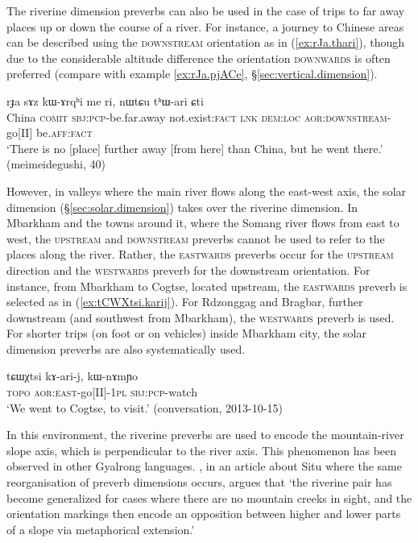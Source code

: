 The  riverine dimension preverbs can also be used in the case of trips to far away places up or down the course of a river. For instance, a journey to Chinese areas can be described using the \textsc{downstream} orientation as in (\ref{ex:rJa.thari}), though due to the considerable altitude difference the orientation \textsc{downwards} is often preferred (compare with example \ref{ex:rJa.pjACe}, §\ref{sec:vertical.dimension}).

 \begin{exe}
\ex \label{ex:rJa.thari}
\gll rɟa sɤz kɯ-ɤrqʰi me ri, nɯtɕu tʰɯ-ari ɕti  \\
China \textsc{comit} \textsc{sbj}:\textsc{pcp}-be.far.away not.exist:\textsc{fact} \textsc{lnk} \textsc{dem}:\textsc{loc} \textsc{aor}:\textsc{downstream}-go[II] be.\textsc{aff}:\textsc{fact} \\
\glt `There is no [place] further away [from here] than China, but he went there.' (meimeidegushi, 40)
\end{exe}
 
However, in valleys where the main river flows along the east-west axis, the solar dimension (§\ref{sec:solar.dimension}) takes over the riverine dimension. In Mbarkham and the towns around it, where the Somang river flows from east to west, the \textsc{upstream} and \textsc{downstream} preverbs cannot be used to refer to the places along the river. Rather, the \textsc{eastwards} preverbs occur for the \textsc{upstream} direction and the \textsc{westwards} preverb for the downstream orientation. For instance, from Mbarkham to Cogtse, located upstream, the \textsc{eastwards} preverb is selected as in (\ref{ex:tCWXtsi.karij}). For Rdzonggag and Bragbar, further downstream (and southwest from Mbarkham), the \textsc{westwards} preverb is used. For shorter trips (on foot or on vehicles) inside Mbarkham city, the solar dimension preverbs are also systematically used.

 \begin{exe}
\ex \label{ex:tCWXtsi.karij}
\gll tɕɯχtsi kɤ-ari-j, kɯ-nɤmɲo  \\
\textsc{topo} \textsc{aor}:\textsc{east}-go[II]-\textsc{1pl} \textsc{sbj}:\textsc{pcp}-watch \\
\glt `We went to Cogtse, to visit.' (conversation, 2013-10-15)
\end{exe}

In this environment, the riverine preverbs are used to encode the mountain-river slope axis, which is perpendicular to the river axis. This phenomenon has been observed in other Gyalrong languages. \citet[34]{lin02dimension}, in an article about Situ where the same reorganisation of preverb dimensions occurs, argues that `the riverine pair has become generalized for cases where there are no mountain creeks in sight, and the orientation markings then encode an opposition between higher and lower parts of a slope via metaphorical extension.'


